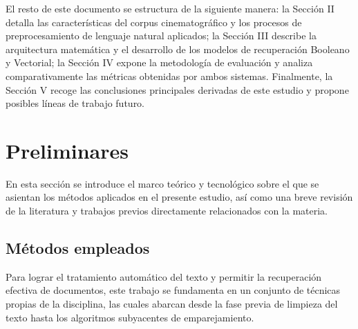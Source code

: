 \documentclass[conference,a4paper]{IEEEtran}
\begin{document}
El resto de este documento se estructura de la siguiente manera: la Sección II 
detalla las características del corpus cinematográfico y los procesos de 
preprocesamiento de lenguaje natural aplicados; la Sección III describe la 
arquitectura matemática y el desarrollo de los modelos de recuperación Booleano y 
Vectorial; la Sección IV expone la metodología de evaluación y analiza 
comparativamente las métricas obtenidas por ambos sistemas. Finalmente, la Sección V 
recoge las conclusiones principales derivadas de este estudio y propone posibles líneas 
de trabajo futuro.


\section{Preliminares}

En esta sección se introduce el marco teórico y tecnológico sobre el que se
asientan los métodos aplicados en el presente estudio, así como una breve 
revisión de la literatura y trabajos previos directamente relacionados con la 
materia.

\subsection{Métodos empleados}

Para lograr el tratamiento automático del texto y permitir la recuperación 
efectiva de documentos, este trabajo se fundamenta en un conjunto de técnicas
propias de la disciplina, las cuales abarcan desde la fase previa de limpieza
del texto hasta los algoritmos subyacentes de emparejamiento.
\end{document}
